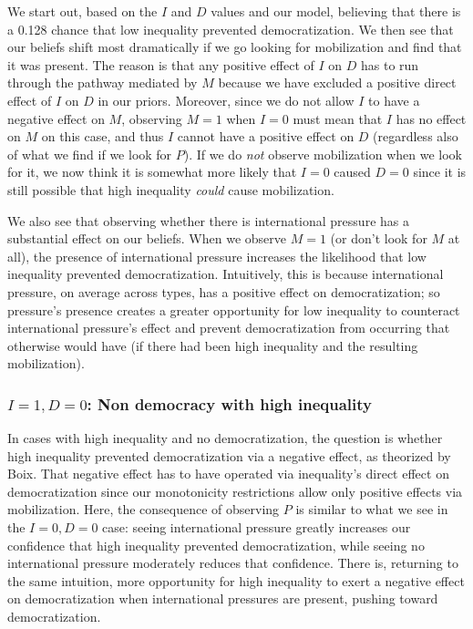 \documentclass[12pt,]{book}
\begin{document}
We start out, based on the \(I\) and \(D\) values and our model, believing that there is a 0.128 chance that low inequality prevented democratization. We then see that our beliefs shift most dramatically if we go looking for mobilization and find that it was present. The reason is that any positive effect of \(I\) on \(D\) has to run through the pathway mediated by \(M\) because we have excluded a positive direct effect of \(I\) on \(D\) in our priors. Moreover, since we do not allow \(I\) to have a negative effect on \(M\), observing \(M=1\) when \(I=0\) must mean that \(I\) has no effect on \(M\) on this case, and thus \(I\) cannot have a positive effect on \(D\) (regardless also of what we find if we look for \(P\)). If we do \emph{not} observe mobilization when we look for it, we now think it is somewhat more likely that \(I=0\) caused \(D=0\) since it is still possible that high inequality \emph{could} cause mobilization.

We also see that observing whether there is international pressure has a substantial effect on our beliefs. When we observe \(M=1\) (or don't look for \(M\) at all), the presence of international pressure increases the likelihood that low inequality prevented democratization. Intuitively, this is because international pressure, on average across types, has a positive effect on democratization; so pressure's presence creates a greater opportunity for low inequality to counteract international pressure's effect and prevent democratization from occurring that otherwise would have (if there had been high inequality and the resulting mobilization).

\hypertarget{i1-d0-non-democracy-with-high-inequality}{%
\subsubsection{\texorpdfstring{\(I=1, D=0\): Non democracy with high inequality}{I=1, D=0: Non democracy with high inequality}}\label{i1-d0-non-democracy-with-high-inequality}}

In cases with high inequality and no democratization, the question is whether high inequality prevented democratization via a negative effect, as theorized by Boix. That negative effect has to have operated via inequality's direct effect on democratization since our monotonicity restrictions allow only positive effects via mobilization. Here, the consequence of observing \(P\) is similar to what we see in the \(I=0, D=0\) case: seeing international pressure greatly increases our confidence that high inequality prevented democratization, while seeing no international pressure moderately reduces that confidence. There is, returning to the same intuition, more opportunity for high inequality to exert a negative effect on democratization when international pressures are present, pushing toward democratization.
\end{document}

